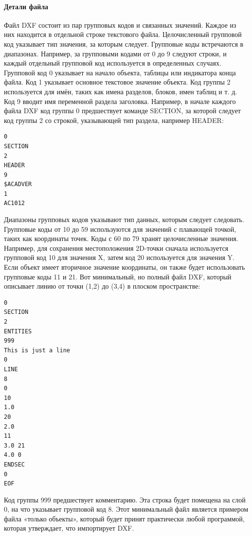 \paragraph{Детали файла}
Файл DXF состоит из пар групповых кодов и связанных значений. Каждое из них находится в отдельной строке текстового файла. Целочисленный групповой код указывает тип значения, за которым следует. Групповые коды встречаются в диапазонах. Например, за групповыми кодами от 0 до 9 следуют строки, и каждый отдельный групповой код используется в определенных случаях. Групповой код 0 указывает на начало объекта, таблицы или индикатора конца файла. Код 1 указывает основное текстовое значение объекта. Код группы 2 используется для имён, таких как имена разделов, блоков, имен таблиц и т. д. Код 9 вводит имя переменной раздела заголовка. Например, в начале каждого файла DXF код группы 0 предшествует команде SECTION, за которой следует код группы 2 со строкой, указывающей тип раздела, например HEADER:

\begin{lstlisting}[label=list:dxfheader]
0
SECTION
2
HEADER
9
$ACADVER
1
AC1012
\end{lstlisting}

Диапазоны групповых кодов указывают тип данных, которым следует следовать. Групповые коды от 10 до 59 используются для значений с плавающей точкой, таких как координаты точек. Коды с 60 по 79 хранят целочисленные значения. Например, для сохранения местоположения 2D-точки сначала используется групповой код 10 для значения X, затем код 20 используется для значения Y. Если объект имеет вторичное значение координаты, он также будет использовать групповые коды 11 и 21. Вот минимальный, но полный файл DXF, который описывает линию от точки (1,2) до (3,4) в плоском пространстве:

\begin{lstlisting}[label=list:dxflinefull]
0
SECTION
2
ENTITIES
999
This is just a line
0
LINE
8
0
10
1.0
20
2.0
11
3.0 21
4.0 0
ENDSEC
0
EOF
\end{lstlisting}

Код группы 999 предшествует комментарию. Эта строка будет помещена на слой 0, на что указывает групповой код 8. Этот минимальный файл является примером файла «только объекты», который будет принят практически любой программой, которая утверждает, что импортирует DXF.

